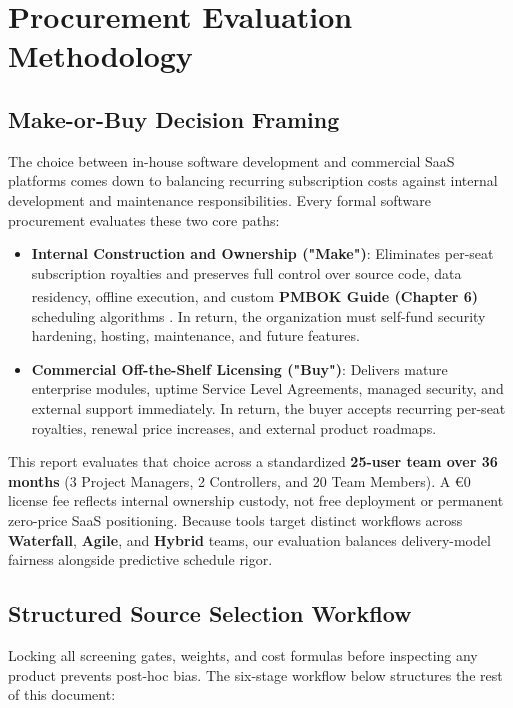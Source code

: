 \chapter{Procurement Evaluation Methodology}
\section{Make-or-Buy Decision Framing}
The choice between in-house software development and commercial SaaS platforms comes down to balancing recurring subscription costs against internal development and maintenance responsibilities. Every formal software procurement evaluates these two core paths:
\begin{itemize}[itemsep=1pt,topsep=1pt]
    \item \textbf{Internal Construction and Ownership ("Make")}: Eliminates per-seat subscription royalties and preserves full control over source code, data residency, offline execution, and custom \textbf{PMBOK\textsuperscript{\textregistered} Guide (Chapter 6)} scheduling algorithms \cite{pmbok}. In return, the organization must self-fund security hardening, hosting, maintenance, and future features.
    \item \textbf{Commercial Off-the-Shelf Licensing ("Buy")}: Delivers mature enterprise modules, uptime Service Level Agreements, managed security, and external support immediately. In return, the buyer accepts recurring per-seat royalties, renewal price increases, and external product roadmaps.
\end{itemize}

\vspace{2mm}

\noindent This report evaluates that choice across a standardized \textbf{25-user team over 36 months} (3 Project Managers, 2 Controllers, and 20 Team Members). A €0 license fee reflects internal ownership custody, not free deployment or permanent zero-price SaaS positioning. Because tools target distinct workflows across \textbf{Waterfall}, \textbf{Agile}, and \textbf{Hybrid} teams, our evaluation balances delivery-model fairness alongside predictive schedule rigor.

\vspace{8mm}

\section{Structured Source Selection Workflow}
Locking all screening gates, weights, and cost formulas before inspecting any product prevents post-hoc bias. The six-stage workflow below structures the rest of this document:


